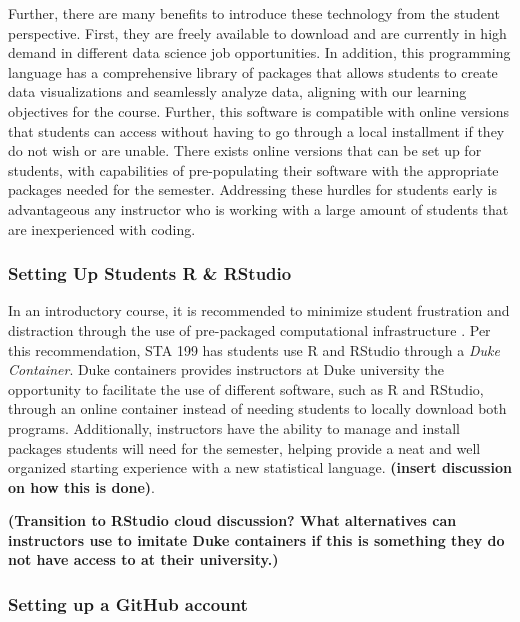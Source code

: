 \documentclass[
  12pt]{article}
\begin{document}
Further, there are many benefits to introduce these technology from the
student perspective. First, they are freely available to download and
are currently in high demand in different data science job
opportunities. In addition, this programming language has a
comprehensive library of packages that allows students to create data
visualizations and seamlessly analyze data, aligning with our learning
objectives for the course. Further, this software is compatible with
online versions that students can access without having to go through a
local installment if they do not wish or are unable. There exists online
versions that can be set up for students, with capabilities of
pre-populating their software with the appropriate packages needed for
the semester. Addressing these hurdles for students early is
advantageous any instructor who is working with a large amount of
students that are inexperienced with coding.

\hypertarget{setting-up-students-r-rstudio}{%
\subsubsection{Setting Up Students R \&
RStudio}\label{setting-up-students-r-rstudio}}

In an introductory course, it is recommended to minimize student
frustration and distraction through the use of pre-packaged
computational infrastructure \citep{Rundel2018}. Per this
recommendation, STA 199 has students use R and RStudio through a
\emph{Duke Container}. Duke containers provides instructors at Duke
university the opportunity to facilitate the use of different software,
such as R and RStudio, through an online container instead of needing
students to locally download both programs. Additionally, instructors
have the ability to manage and install packages students will need for
the semester, helping provide a neat and well organized starting
experience with a new statistical language. \textbf{(insert discussion
on how this is done)}.

\textbf{(Transition to RStudio cloud discussion? What alternatives can
instructors use to imitate Duke containers if this is something they do
not have access to at their university.)}

\hypertarget{setting-up-a-github-account}{%
\subsubsection{Setting up a GitHub
account}\label{setting-up-a-github-account}}
\end{document}
